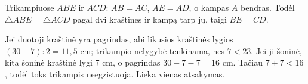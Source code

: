 \documentclass[12pt,a4paper,reqno]{amsart}
\theoremstyle{plain}\newtheorem{theorem}{Teorema}[section]
\theoremstyle{definition}
\theoremstyle{remark}\newtheorem{remark}[theorem]{Pastaba}\newtheorem*{remark*}{Pastaba}
\theoremstyle{definition}\newtheorem*{problem*}{Uždavinys}
\begin{document}
\begin{solution}[\ref{uzd:savikontrole-11}] Trikampiuose $ABE$ ir $ACD$: $AB=AC$, $AE=AD$, o kampas $A$ bendras. Todėl $\triangle ABE=\triangle ACD$ pagal dvi kraštines ir kampą tarp jų, taigi $BE=CD$. \end{solution}
\begin{solution}[\ref{uzd:savikontrole-12}] Jei duotoji kraštinė yra pagrindas, abi likusios kraštinės lygios $(30-7):2=11{,}5$ cm; trikampio nelygybė tenkinama, nes $7<23$. Jei ji šoninė, kita šoninė kraštinė lygi $7$ cm, o pagrindas $30-7-7=16$ cm. Tačiau $7+7<16$, todėl toks trikampis neegzistuoja. Lieka vienas atsakymas. \end{solution}
\end{document}
